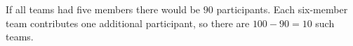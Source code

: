 If all teams had five members there would be $90$ participants. Each six-member team contributes one additional participant, so there are $100-90=\boxed{10}$ such teams.
